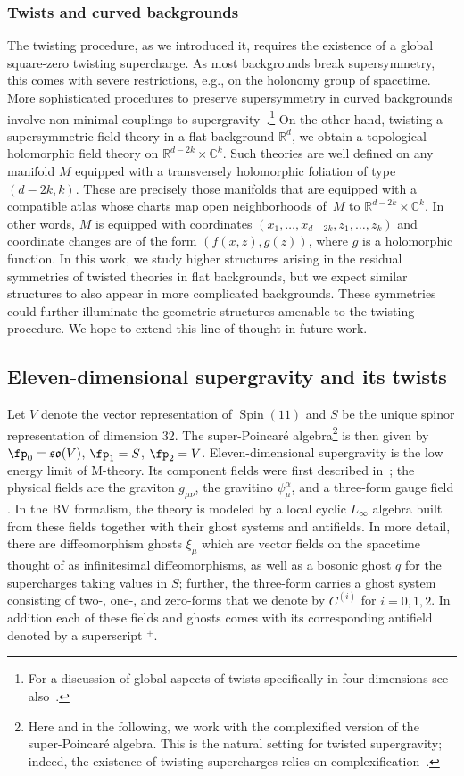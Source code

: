 \documentclass[pdftex]{sigma}
\numberwithin{equation}{section}
\theoremstyle{definition}
\def\R{\mathbb{R}}
\def\C{\mathbb{C}}
\def\lie#1{\ensuremath{\mathfrak{#1}}}
\DeclareMathOperator{\Spin}{Spin}
\def\so{\lie{so}}
\begin{document}
\subsubsection{Twists and curved backgrounds}
The twisting procedure, as we introduced it, requires the existence of a global square-zero twisting supercharge. As most backgrounds break supersymmetry, this comes with severe restrictions, e.g., on the holonomy group of spacetime. More sophisticated procedures to preserve supersymmetry in curved backgrounds involve non-minimal couplings to supergravity~\cite{Festuccia:2011ws}.\footnote{For a discussion of global aspects of twists specifically in four dimensions see also~\cite{Cushing:2023rha}.} On the other hand, twisting a supersymmetric field theory in a flat background $\R^d$, we obtain a topological-holomorphic field theory on $\R^{d-2k} \times \C^k$. Such theories are well defined on any manifold $M$ equipped with a transversely holomorphic foliation of type $(d-2k, k)$. These are precisely those manifolds that are equipped with a compatible atlas whose charts map open neighborhoods of~$M$ to $\R^{d-2k} \times \C^k$. In other words, $M$ is equipped with coordinates $(x_1, \dots, x_{d-2k}, z_{1}, \dots , z_k)$ and coordinate changes are of the form $(f(x,z), g(z))$, where $g$ is a holomorphic function. In this work, we study higher structures arising in the residual symmetries of twisted theories in flat backgrounds, but we expect similar structures to also appear in more complicated backgrounds. These symmetries could further illuminate the geometric structures amenable to the twisting procedure. We hope to extend this line of thought in future work.

\subsection{Eleven-dimensional supergravity and its twists}
Let $V$ denote the vector representation of $\Spin(11)$ and $S$ be the unique spinor representation of dimension 32. The super-Poincar\'e algebra\footnote{Here and in the following, we work with the complexified version of the super-Poincar\'e algebra. This is the natural setting for twisted supergravity; indeed, the existence of twisting supercharges relies on complexification~\cite{NV,ElliottSafronov}.} is then given by
$
 \fp_0 = \so(V)$, $\fp_1 = S$, $\fp_2 = V $.
Eleven-dimensional supergravity is the low energy limit of M-theory. Its component fields were first described in~\cite{CJS}; the physical fields are the graviton $g_{\mu \nu}$, the gravitino $\psi_\mu^\alpha$, and a three-form gauge field . In the BV formalism, the theory is modeled by a local cyclic $L_\infty$ algebra built from these fields together with their ghost systems and antifields. In more detail, there are diffeomorphism ghosts $\xi_\mu$ which are vector fields on the spacetime thought of as infinitesimal diffeomorphisms, as well as a bosonic ghost $q$ for the supercharges taking values in $S$; further, the three-form carries a ghost system consisting of two-, one-, and zero-forms that we denote by $C^{(i)}$ for $i=0,1,2$. In addition each of these fields and ghosts comes with its corresponding antifield denoted by a superscript $^+$.
\end{document}
